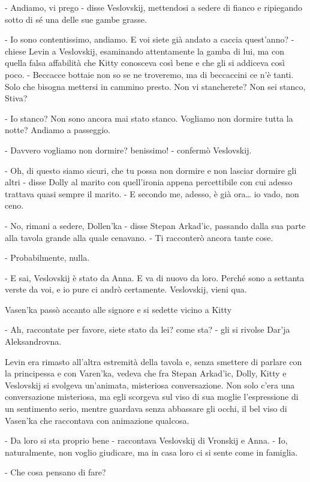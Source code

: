 - Andiamo, vi prego - disse Veslovskij, mettendosi a sedere di fianco e ripiegando sotto di sé una delle sue gambe grasse. 

- Io sono contentissimo, andiamo. E voi siete già andato a caccia quest'anno? - chiese Levin a Veslovskij, esaminando attentamente la gamba di lui, ma con quella falsa affabilità che Kitty conosceva così bene e che gli si addiceva così poco. - Beccacce bottaie non so se ne troveremo, ma di beccaccini ce n'è tanti. Solo che bisogna mettersi in cammino presto. Non vi stancherete? Non sei stanco, Stiva? 

- Io stanco? Non sono ancora mai stato stanco. Vogliamo non dormire tutta la notte? Andiamo a passeggio. 

- Davvero vogliamo non dormire? benissimo! - confermò Veslovskij. 

- Oh, di questo siamo sicuri, che tu possa non dormire e non lasciar dormire gli altri - disse Dolly al marito con quell'ironia appena percettibile con cui adesso trattava quasi sempre il marito. - E secondo me, adesso, è già ora\ldots{} io vado, non ceno. 

- No, rimani a sedere, Dollen'ka - disse Stepan Arkad'ic, passando dalla sua parte alla tavola grande alla quale cenavano. - Ti racconterò ancora tante cose. 

- Probabilmente, nulla. 

- E sai, Veslovskij è stato da Anna. E va di nuovo da loro. Perché sono a settanta verste da voi, e io pure ci andrò certamente. Veslovskij, vieni qua. 

Vasen'ka passò accanto alle signore e si sedette vicino a Kitty 

- Ah, raccontate per favore, siete stato da lei? come sta? - gli si rivolse Dar'ja Aleksandrovna. 

Levin era rimasto all'altra estremità della tavola e, senza smettere di parlare con la principessa e con Varen'ka, vedeva che fra Stepan Arkad'ic, Dolly, Kitty e Veslovskij si svolgeva un'animata, misteriosa conversazione. Non solo c'era una conversazione misteriosa, ma egli scorgeva sul viso di sua moglie l'espressione di un sentimento serio, mentre guardava senza abbassare gli occhi, il bel viso di Vasen'ka che raccontava con animazione qualcosa. 

- Da loro si sta proprio bene - raccontava Veslovskij di Vronskij e Anna. - Io, naturalmente, non voglio giudicare, ma in casa loro ci si sente come in famiglia. 

- Che cosa pensano di fare? 


